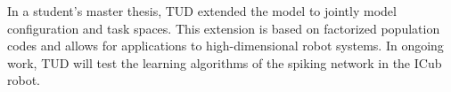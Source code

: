 In a student's master thesis, TUD extended the model to jointly model 
configuration and task spaces. This extension is based on factorized population 
codes and allows for applications to high-dimensional robot systems. In ongoing 
work, TUD will test the learning algorithms of the spiking network in the ICub 
robot.    



% 
% 
% 
